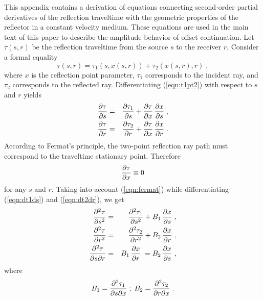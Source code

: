 \label{chapter:deriv}
This appendix contains a derivation of equations connecting
second-order partial derivatives of the reflection traveltime with the
geometric properties of the reflector in a constant velocity medium.
These equations are used in the main text of this paper to describe
the amplitude behavior of offset continuation.  Let $\tau(s,r)$ be the
reflection traveltime from the source $s$ to the receiver $r$.
Consider a formal equality
\begin{equation}
\tau(s,r)=\tau_1\left(s,x(s,r)\right)+\tau_2\left(x(s,r),r\right)\;,   
\label{eqn:t1pt2} 
\end{equation}
where $x$ is the reflection point parameter, $\tau_1$ corresponds to the
incident ray, and $\tau_2$ corresponds to the reflected ray.
Differentiating (\ref{eqn:t1pt2}) with respect to $s$ and $r$ yields
\begin{eqnarray}
{\partial \tau \over \partial s}  & = & 
{\partial \tau_1 \over \partial s} + {\partial \tau \over \partial x}\,
{\partial x \over \partial s}\;,
\label{eqn:dt1ds} \\
{\partial \tau \over \partial r}  & = & 
{\partial \tau_2 \over \partial r} + {\partial \tau \over \partial x}\,
{\partial x \over \partial r}\;.
\label{eqn:dt2dr} 
\end{eqnarray}
According to Fermat's principle, the two-point reflection ray path must
correspond to  the traveltime stationary point. Therefore 
\begin{equation}
{\partial \tau \over \partial x} \equiv 0  
\label{eqn:fermat} 
\end{equation}
for any $s$ and $r$. Taking into account (\ref{eqn:fermat}) while
differentiating (\ref{eqn:dt1ds}) and (\ref{eqn:dt2dr}), we get
\begin{eqnarray}
{\partial^2 \tau \over \partial s^2}  & = & 
{\partial^2 \tau_1 \over \partial s^2} + 
B_1\,
{\partial x \over \partial s}\;,
\label{eqn:d2tds2} \\
{\partial^2 \tau \over \partial r^2}  & = & 
{\partial^2 \tau_2 \over \partial r^2} + 
B_2\,
{\partial x \over \partial r}\;,
\label{eqn:d2tdr2} \\
{\partial^2 \tau \over \partial s \partial r}  & = &  
B_1\,
{\partial x \over \partial r}\;=
B_2\,
{\partial x \over \partial s}\;,
\label{eqn:d2tdsdr}
\end{eqnarray}
where
\[
B_1={\partial^2 \tau_1 \over \partial s \partial x}\;;\;
B_2={\partial^2 \tau_2 \over \partial r \partial x}\;.
\]

